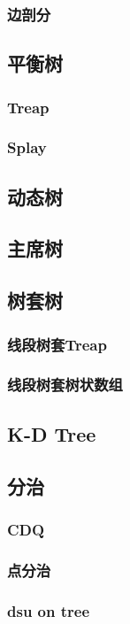 \documentclass[twocolumn,a4]{article}
\newcommand{\addcpp}[1]{}
\begin{document}
		\subsubsection{边剖分}
	\subsection{平衡树}
		\subsubsection{Treap}
			\addcpp{datastruct/treap}
		\subsubsection{Splay}
	\subsection{动态树}
	\subsection{主席树}
	\subsection{树套树}
		\subsubsection{线段树套Treap}
		\subsubsection{线段树套树状数组}
	\subsection{K-D Tree}
	\subsection{分治}
		\subsubsection{CDQ}
		\subsubsection{点分治}
		\subsubsection{dsu on tree}
\end{document}
